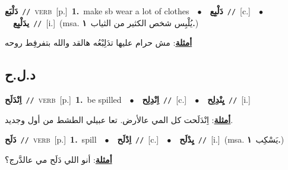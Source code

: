 \documentclass[10pt,a4paper,twoside]{article} %
\begin{document}
\begin{multicols}{2}
{\setlength\topsep{0pt}\textbf{\foreignlanguage{arabic}{دَلْبَع}}\ {\color{gray}\texttt{//}\color{black}}\ \textsc{verb}\ [p.]\ \textbf{1.}~make sb wear a lot of clothes\ \ $\bullet$\ \ \setlength\topsep{0pt}\textbf{\foreignlanguage{arabic}{دَلْبِع}}\ {\color{gray}\texttt{//}\color{black}}\ [c.]\ \ $\bullet$\ \ \setlength\topsep{0pt}\textbf{\foreignlanguage{arabic}{يدَلْبِع}}\ {\color{gray}\texttt{//}\color{black}}\ [i.]\ \color{gray}(msa. \foreignlanguage{arabic}{يُلْبِس شخص الكثير من الثياب}~\foreignlanguage{arabic}{\textbf{١.}})\color{black}\  \begin{flushright}\color{gray}\foreignlanguage{arabic}{\textbf{\underline{\foreignlanguage{arabic}{أمثلة}}}: مش حرام عليها تدَلِبْعُه هالقد والله بتفرفِط روحه}\end{flushright}\color{black}} \vspace{2mm}

\vspace{-3mm}
\subsection*{\color{blue}\foreignlanguage{arabic}{د.ل.ح}\color{blue}{}} 

{\setlength\topsep{0pt}\textbf{\foreignlanguage{arabic}{اِنْدَلَح}}\ {\color{gray}\texttt{//}\color{black}}\ \textsc{verb}\ [p.]\ \textbf{1.}~be spilled\ \ $\bullet$\ \ \setlength\topsep{0pt}\textbf{\foreignlanguage{arabic}{اِنْدِلِح}}\ {\color{gray}\texttt{//}\color{black}}\ [c.]\ \ $\bullet$\ \ \setlength\topsep{0pt}\textbf{\foreignlanguage{arabic}{يِنْدِلِح}}\ {\color{gray}\texttt{//}\color{black}}\ [i.]\  \begin{flushright}\color{gray}\foreignlanguage{arabic}{\textbf{\underline{\foreignlanguage{arabic}{أمثلة}}}: اِنْدَلَحت كل المي عالأرض. تعا عبيلي الطشط من أول وجديد.}\end{flushright}\color{black}} \vspace{2mm}

{\setlength\topsep{0pt}\textbf{\foreignlanguage{arabic}{دَلَح}}\ {\color{gray}\texttt{//}\color{black}}\ \textsc{verb}\ [p.]\ \textbf{1.}~spill\ \ $\bullet$\ \ \setlength\topsep{0pt}\textbf{\foreignlanguage{arabic}{اِدْلَح}}\ {\color{gray}\texttt{//}\color{black}}\ [c.]\ \ $\bullet$\ \ \setlength\topsep{0pt}\textbf{\foreignlanguage{arabic}{يِدْلَح}}\ {\color{gray}\texttt{//}\color{black}}\ [i.]\ \color{gray}(msa. \foreignlanguage{arabic}{يَسْكِب}~\foreignlanguage{arabic}{\textbf{١.}})\color{black}\  \begin{flushright}\color{gray}\foreignlanguage{arabic}{\textbf{\underline{\foreignlanguage{arabic}{أمثلة}}}: أنو اللي دَلَح مي عالدَّرج؟}\end{flushright}\color{black}} \vspace{2mm}


\end{multicols}
\end{document}
